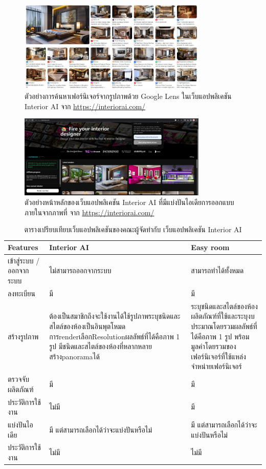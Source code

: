 \documentclass[12pt,oneside,openright,a4paper]{cpe-thai-project}
\begin{document}
\vspace{\fill}\clearpage

\begin{figure}[!h]\centering
\includegraphics[width=9cm]{image/interior-ai.jpg}
\caption{ตัวอย่างการค้นหาเฟอร์นิเจอร์จากรูปภาพด้วย Google Lens ในเว็บแอปพลิเคชัน Interior AI จาก \url{https://interiorai.com/}}
\label{fig:interior-ai}
\end{figure}

\begin{figure}[!h]\centering
\includegraphics[width=9cm]{image/interior-ai-2.jpg}
\caption{ตัวอย่างหน้าหลักของเว็บแอปพลิเคชัน Interior AI ที่มีแบ่งปันไอเดียการออกแบบภายในจากภาพที่ จาก \url{https://interiorai.com/}}
\label{fig:interior-ai-2}
\end{figure}

\begin{table}[!h]
\caption{ตารางเปรียบเทียบเว็บแอปพลิเคชันของคณะผู้จัดทำกับ เว็บแอปพลิเคชัน Interior AI }\label{tbl:interior-ai-table}
  \begin{tabular}{|p{4cm}|p{5cm}|p{5cm}|}
  \hline
  \textbf{Features} & \textbf{ Interior AI} & \textbf{Easy room } \\
  \hline
  เข้าสู่ระบบ / ออกจากระบบ & ไม่สามารถออกจากระบบ & สามารถทำได้ทั้งหมด \\
  \hline
  ลงทะเบียน & มี & มี \\
  \hline
  สร้างรูปภาพ & ต้องเป็นสมาชิกถึงจะใช้งานได้ใช้รูปภาพระบุชนิดและสไตล์ของห้องเป็นอินพุตโหมดการrenderเลือกResolutionผลลัพธ์ที่ได้คือภาพ 1 รูป มีชนิดและสไตล์ของห้องที่หลากหลายสร้างpanoramaได้ & ระบุชนิดและสไตล์ของห้องผลิตภัณฑ์ที่ใช้และระบุงบประมาณโดยรวมผลลัพธ์ที่ได้คือภาพ 1 รูป พร้อมมูลค่าโดยรวมของเฟอร์นิเจอร์ที่ใช้แหล่งจำหน่ายเฟอร์นิเจอร์ \\
  \hline
  ตรวจจับผลิตภัณฑ์ & มี & มี \\
  \hline
  ประวัติการใช้งาน & ไม่มี & มี \\
  \hline
  แบ่งปันไอเดีย & มี แต่สามารถเลือกได้ว่าจะแบ่งปันหรือไม่ & มี แต่สามารถเลือกได้ว่าจะแบ่งปันหรือไม่ \\
  \hline
  ประวัติการใช้งาน & ไม่มี & ไม่มี \\
  \hline
\end{tabular}
\end{table}
\end{document}
